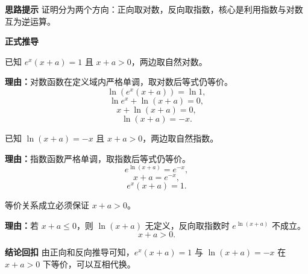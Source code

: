 \begin{proofbox}
	\textbf{\textcolor{CProof}{思路提示}}
	证明分为两个方向：正向取对数，反向取指数，核心是利用指数与对数互为逆运算。

	\medskip
	\textbf{\textcolor{CProof}{正式推导}}
	\begin{description}[style=nextline,leftmargin=2.8em,labelsep=0.5em,itemsep=0.55em]
		\item[\textbf{步骤一（正向取对数）：}]
			已知 $e^{x}(x+a)=1$ 且 $x+a>0$，两边取自然对数。
			\par\textbf{理由：}对数函数在定义域内严格单调，取对数后等式仍等价。
			\[
				\ln(e^{x}(x+a)) = \ln 1,
			\]
			\[
				\ln e^{x} + \ln(x+a) = 0,
			\]
			\[
				x + \ln(x+a) = 0,
			\]
			\[
				\ln(x+a) = -x.
			\]
		\item[\textbf{步骤二（反向取指数）：}]
			已知 $\ln(x+a)=-x$ 且 $x+a>0$，两边取自然指数。
			\par\textbf{理由：}指数函数严格单调，取指数后等式仍等价。
			\[
				e^{\ln(x+a)} = e^{-x},
			\]
			\[
				x+a = e^{-x},
			\]
			\[
				e^{x}(x+a) = 1.
			\]
		\item[\textbf{步骤三（条件维护）：}]
			等价关系成立必须保证 $x+a>0$。
			\par\textbf{理由：}若 $x+a\leq0$，则 $\ln(x+a)$ 无定义，反向取指数时 $e^{\ln(x+a)}$ 不成立。
			\[
				x+a>0.
			\]
	\end{description}

	\medskip
	\textbf{\textcolor{CProof}{结论回扣}}
	由正向和反向推导可知，$e^{x}(x+a)=1$ 与 $\ln(x+a)=-x$ 在 $x+a>0$ 下等价，可以互相代换。
\end{proofbox}
